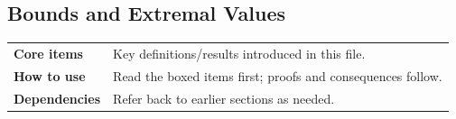 
\subsection{Bounds and Extremal Values}

\begin{tcolorbox}[colback=gray!6, colframe=gray!40, arc=2pt,
  left=6pt, right=6pt, top=4pt, bottom=4pt,
  title={\small\textbf{Bounds Extremal Values — Quick Reference}},
  fonttitle=\small\bfseries]
\begin{tabular}{@{}p{}p{}@{}}
\textbf{Core items} & Key definitions/results introduced in this file.\\
\textbf{How to use} & Read the boxed items first; proofs and consequences follow.\\
\textbf{Dependencies} & Refer back to earlier sections as needed.\\
\end{tabular}
\end{tcolorbox}


